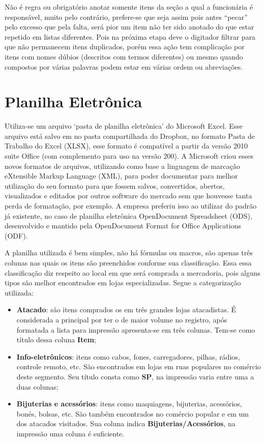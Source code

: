 \documentclass[
	12pt,
	openright,
	oneside, %
	a4paper,
	chapter=TITLE,
	section=TITLE,
	english,
	brazil %
	]{abntex2-udesc}
\begin{document}
Não é regra ou obrigatório anotar somente itens da seção a qual a funcionária é responsável, muito pelo contrário, prefere-se que seja assim pois antes ``pecar'' pelo excesso que pela falta, será pior um item não ter sido anotado do que estar repetido em listas diferentes. Pois na próxima etapa deve o digitador filtrar para que não permanecem itens duplicados, porém essa ação tem complicação por itens com nomes dúbios (descritos com termos diferentes) ou mesmo quando compostos por várias palavras podem estar em várias ordem ou abreviações.

\section{Planilha Eletrônica}

Utiliza-se um arquivo `pasta de planilha eletrônica' do Microsoft Excel. Esse arquivo está salvo em no pasta compartilhada do Dropbox, no formato Pasta de Trabalho do Excel (XLSX), esse formato é compatível a partir da versão 2010 suite Office (com complemento para uso na versão 200). A Microsoft criou esses novos formatos de arquivos, utilizando como base a linguagem de marcação eXtensible Markup Language (XML), para poder documentar para melhor utilização do seu formato para que fossem salvos, convertidos, abertos, visualizados e editados por outros software do mercado sem que houvesse tanta perda de formatação, por exemplo. A empresa preferiu isso ao utilizar do padrão já existente, no caso de planilha eletrônica OpenDocument Spreadsheet (ODS), desenvolvido e mantido pela OpenDocument Format for Office Applications (ODF).

A planilha utilizada é bem simples, não há fórmulas ou macros, são apenas três colunas nas quais os itens são preenchidos conforme sua classificação. Essa essa classificação diz respeito ao local em que será comprada a mercadoria, pois alguns tipos são melhor encontrados em lojas especializadas. Segue a categorização utilizada:

\begin{itemize}
\item \textbf{Atacado}: são itens comprados os em três grandes lojas atacadistas. É considerada a principal por ter o de maior volume no registro, após formatada a lista para impressão apresenta-se em três colunas. Tem-se como título dessa coluna \textbf{Item};
\item \textbf{Info-eletrônicos}: itens como cabos, fones, carregadores, pilhas, rádios, controle remoto, etc. São encontrados em lojas em ruas populares no comércio deste segmento. Seu título consta como \textbf{SP}, na impressão varia entre uma a duas colunas;
\item \textbf{Bijuterias e acessórios}: itens como maquiagens, bijuterias, acessórios, bonés, bolsas, etc. São também encontrados no comércio popular e em um dos atacados visitados. Sua coluna indica \textbf{Bijuterias/Acessórios}, na impressão uma coluna é suficiente.
\end{itemize}
\end{document}
